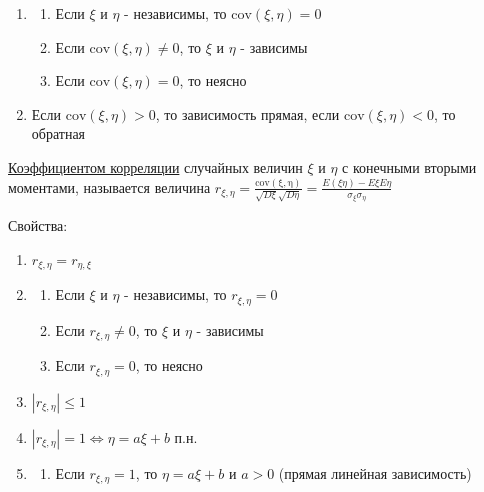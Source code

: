 \documentclass[12pt]{article}
\begin{document}
\begin{enumerate}
\begin{enumerate}
        \item \begin{enumerate}
            \item Если $\xi$ и $\eta$ - независимы, то $\mathrm{cov}(\xi, \eta) = 0$

            \item Если $\mathrm{cov}(\xi, \eta) \neq 0$, то $\xi$ и $\eta$ - зависимы

            \item Если $\mathrm{cov}(\xi, \eta) = 0$, то неясно
        \end{enumerate}

        \item Если $\mathrm{cov}(\xi, \eta) > 0$, то зависимость прямая, если $\mathrm{cov}(\xi, \eta) < 0$, то обратная
    \end{enumerate}

    \hyperlink{correlation}{Коэффициентом корреляции} случайных величин $\xi$ и $\eta$ с конечными вторыми моментами,
    называется величина $r_{\xi,\eta} = \frac{\mathrm{cov(\xi, \eta)}}{\sqrt{D\xi} \sqrt{D\eta}} = \frac{E(\xi\eta) - E\xi E\eta}{\sigma_\xi \sigma_\eta}$
    
    Свойства:

    \begin{enumerate}
        \item $r_{\xi, \eta} = r_{\eta, \xi}$

        \item \begin{enumerate}
            \item Если $\xi$ и $\eta$ - независимы, то $r_{\xi,\eta} = 0$

            \item Если $r_{\xi,\eta} \neq 0$, то $\xi$ и $\eta$ - зависимы

            \item Если $r_{\xi,\eta} = 0$, то неясно
        \end{enumerate}

        \item $|r_{\xi,\eta}| \leq 1$

        \item $|r_{\xi,\eta}| = 1 \Longleftrightarrow \eta = a \xi + b$ п.н.

        \item \begin{enumerate} 
            \item Если $r_{\xi,\eta} = 1$, то $\eta = a\xi + b$ и $a > 0$ (прямая линейная зависимость)


\end{enumerate}
\end{enumerate}
\end{enumerate}
\end{document}
